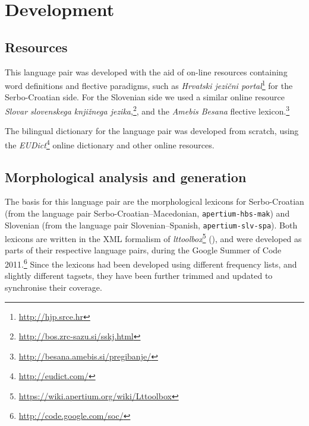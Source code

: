 \section{Development}

\subsection{Resources}
This language pair was developed with the
aid of on-line resources containing word definitions and flective
paradigms, such as \emph{Hrvatski jezični
  portal}\footnote{\url{http://hjp.srce.hr}} for the Serbo-Croatian side. For
the Slovenian side we used a similar online resource \emph{Slovar
  slovenskega knjižnega
  jezika},\footnote{\url{http://bos.zrc-sazu.si/sskj.html}}, and the
\emph{Amebis Besana} flective
lexicon.\footnote{\url{http://besana.amebis.si/pregibanje/}}

The bilingual dictionary for the language pair was developed from scratch,
using the \emph{EUDict}\footnote{\url{http://eudict.com/}} online
dictionary and other online resources.

\subsection{Morphological analysis and generation}
The basis for this language pair are the morphological
lexicons for Serbo-Croatian (from
the language pair Serbo-Croatian--Macedonian, {\small{\tt apertium-hbs-mak}}) and Slovenian (from the
language pair Slovenian--Spanish, {\small{\tt apertium-slv-spa}}). Both
lexicons are written in the XML formalism of
\emph{lttoolbox}\footnote{\url{https://wiki.apertium.org/wiki/Lttoolbox}}
(\citealp{rojas2005construccion}), and were developed as parts of
their respective language pairs, during the Google Summer of Code
2011.\footnote{\url{http://code.google.com/soc/}} Since the lexicons
had been developed using different frequency lists, and slightly
different tagsets, they have been further trimmed and updated to
synchronise their coverage.










